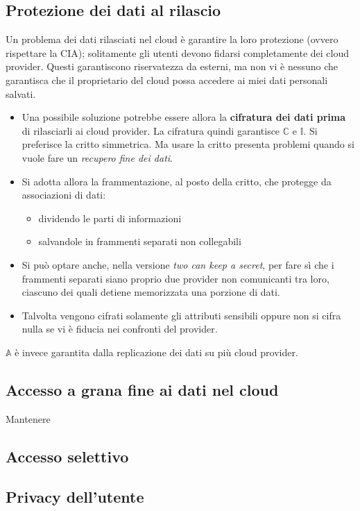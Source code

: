 \subsection{Protezione dei dati al rilascio}
Un problema dei dati rilasciati nel cloud è garantire la loro protezione (ovvero rispettare la CIA); solitamente gli utenti devono fidarsi completamente dei cloud provider. Questi garantiscono riservatezza da esterni, ma non vi è nessuno che garantisca che il proprietario del cloud possa accedere ai miei dati personali salvati.
\begin{itemize}
    \item Una possibile soluzione potrebbe essere allora la \textbf{cifratura dei dati prima} di rilasciarli ai cloud provider. La cifratura quindi garantisce $\mathbb{C}$ e $\mathbb{I}$. Si preferisce la critto simmetrica. Ma usare la critto presenta problemi quando si vuole fare un \textit{recupero fine dei dati}.
    \item Si adotta allora la frammentazione, al posto della critto, che protegge da associazioni di dati:
    \begin{itemize}
        \item dividendo le parti di informazioni
        \item salvandole in frammenti separati non collegabili
    \end{itemize}
    \item Si può optare anche, nella versione \textit{two can keep a secret}, per fare sì che i frammenti separati siano proprio due provider non comunicanti tra loro, ciascuno dei quali detiene memorizzata una porzione di dati.
    \item Talvolta vengono cifrati solamente gli attributi sensibili oppure non si cifra nulla se vi è fiducia nei confronti del provider.
\end{itemize}
$\mathbb{A}$ è invece garantita dalla replicazione dei dati su più cloud provider.

\subsection{Accesso a grana fine ai dati nel cloud}
Mantenere 
\subsection{Accesso selettivo}
\subsection{Privacy dell'utente}

